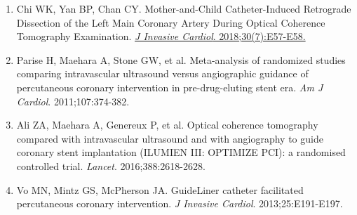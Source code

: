 \documentclass[12pt,a4paper]{article}
\begin{document}
\begin{enumerate}
    \item Chi WK, Yan BP, Chan CY. Mother-and-Child Catheter-Induced Retrograde Dissection of the Left Main Coronary Artery During Optical Coherence Tomography Examination. \href{https://pubmed.ncbi.nlm.nih.gov/29958179/}{\textit{J Invasive Cardiol}. 2018;30(7):E57-E58.}

    \item Parise H, Maehara A, Stone GW, et al. Meta-analysis of randomized studies comparing intravascular ultrasound versus angiographic guidance of percutaneous coronary intervention in pre-drug-eluting stent era. \textit{Am J Cardiol}. 2011;107:374-382.

    \item Ali ZA, Maehara A, Genereux P, et al. Optical coherence tomography compared with intravascular ultrasound and with angiography to guide coronary stent implantation (ILUMIEN III: OPTIMIZE PCI): a randomised controlled trial. \textit{Lancet}. 2016;388:2618-2628.

    \item Vo MN, Mintz GS, McPherson JA. GuideLiner catheter facilitated percutaneous coronary intervention. \textit{J Invasive Cardiol}. 2013;25:E191-E197.
\end{enumerate}
\end{document}
